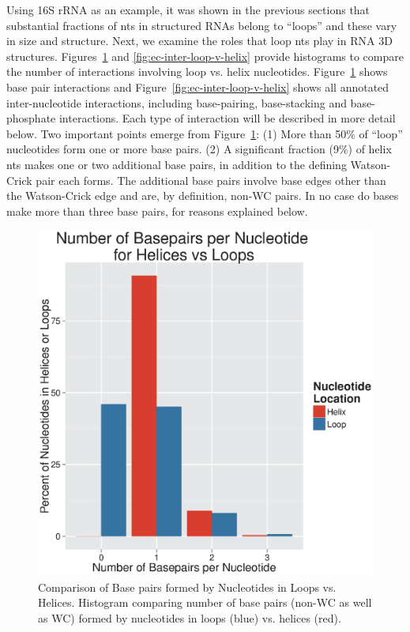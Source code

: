 Using 16S rRNA as an example, it was shown in the previous sections that
substantial fractions of nts in structured RNAs belong to ``loops'' and these
vary in size and structure. Next, we examine the roles that loop nts play in RNA
3D structures. Figures~\ref{fig:ec-bp-loop-v-helix} and
\ref{fig:ec-inter-loop-v-helix} provide histograms to compare the number of
interactions involving loop vs. helix nucleotides.
Figure~\ref{fig:ec-bp-loop-v-helix} shows base pair interactions and
Figure~\ref{fig:ec-inter-loop-v-helix} shows all annotated inter-nucleotide
interactions, including base-pairing, base-stacking and base-phosphate
interactions. Each type of interaction will be described in more detail below.
Two important points emerge from Figure~\ref{fig:ec-bp-loop-v-helix}: (1) More
than 50\% of ``loop'' nucleotides form one or more base pairs. (2) A significant
fraction (9\%) of helix nts makes one or two additional base pairs, in addition
to the defining Watson-Crick pair each forms. The additional base pairs involve
base edges other than the Watson-Crick edge and are, by definition, non-WC
pairs. In no case do bases make more than three base pairs, for reasons
explained below.

\begin{figure}
  \includegraphics[width=0.5\linewidth]{chapter-1/figs/bp-loop-v-helix}
  \caption{Comparison of Base pairs formed by Nucleotides in Loops vs. Helices.
    Histogram comparing number of base pairs (non-WC as well as WC) formed by
  nucleotides in loops (blue) vs. helices (red).}
  \label{fig:ec-bp-loop-v-helix}
\end{figure}

